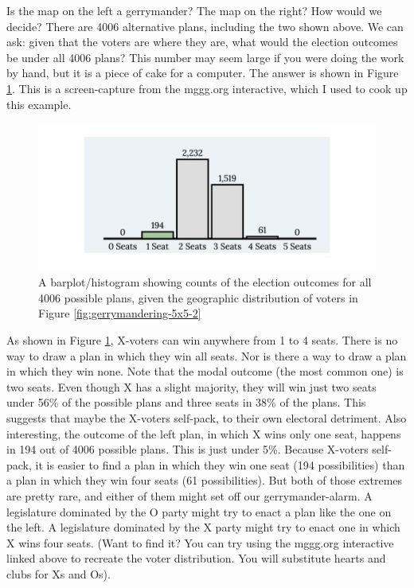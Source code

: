 \documentclass[
  openany]{book}
\begin{document}
Is the map on the left a gerrymander? The map on the right? How would we decide? There are 4006 alternative plans, including the two shown above. We can ask: given that the voters are where they are, what would the election outcomes be under all 4006 plans? This number may seem large if you were doing the work by hand, but it is a piece of cake for a computer. The answer is shown in Figure \ref{fig:gerrymandering-5x5-5}. This is a screen-capture from the mggg.org interactive, which I used to cook up this example.



\begin{figure}

{\centering \includegraphics[width=0.8\linewidth]{images/gerrymandering5x5_5} 

}

\caption{A barplot/histogram showing counts of the election outcomes for all 4006 possible plans, given the geographic distribution of voters in Figure \ref{fig:gerrymandering-5x5-2}}\label{fig:gerrymandering-5x5-5}
\end{figure}

As shown in Figure \ref{fig:gerrymandering-5x5-5}, X-voters can win anywhere from 1 to 4 seats. There is no way to draw a plan in which they win all seats. Nor is there a way to draw a plan in which they win none. Note that the modal outcome (the most common one) is two seats. Even though X has a slight majority, they will win just two seats under 56\% of the possible plans and three seats in 38\% of the plans. This suggests that maybe the X-voters self-pack, to their own electoral detriment. Also interesting, the outcome of the left plan, in which X wins only one seat, happens in 194 out of 4006 possible plans. This is just under 5\%. Because X-voters self-pack, it is easier to find a plan in which they win one seat (194 possibilities) than a plan in which they win four seats (61 possibilities). But both of those extremes are pretty rare, and either of them might set off our gerrymander-alarm. A legislature dominated by the O party might try to enact a plan like the one on the left. A legislature dominated by the X party might try to enact one in which X wins four seats. (Want to find it? You can try using the mggg.org interactive linked above to recreate the voter distribution. You will substitute hearts and clubs for Xs and Os).
\end{document}
